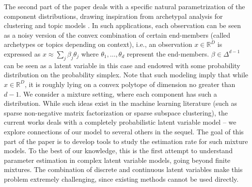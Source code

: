 \documentclass[bj,authoryear]{imsart}
\theoremstyle{plain}
\theoremstyle{remark}
\def\bbR{\mathbb{R}}
\begin{document}
The second part of the paper deals with a specific natural parametrization of the component distributions, drawing inspiration from archetypal analysis \cite{cutler1994archetypal} for clustering and topic models \cite{blei2003latent}. In such applications, each observation can be seen as a noisy version of the convex combination of certain end-members (called archetypes or topics depending on context), i.e., an observation $x\in\bbR^D$ is expressed as $x \approx \sum_j \beta_j\theta_j$ where $\theta_1,\dots,\theta_d$ represent the end-members. $\beta\in\Delta^{d-1}$ can be seen as a latent variable in this case and endowed with some probability distribution on the probability simplex. Note that such modeling imply that while $x\in\bbR^D$, it is roughly lying on a convex polytope of dimension no greater than $d-1$. We consider a mixture setting, where each component has such a distribution. While such ideas exist in the machine learning literature (such as sparse non-negative matrix factorization or sparse subspace clustering), the current works deals with a completely probabilistic latent variable model -- we explore connections of our model to several others in the sequel. The goal of this part of the paper is to develop tools to study the estimation rate for such mixture models. To the best of our knowledge, this is the first attempt to understand parameter estimation in complex latent variable models, going beyond finite mixtures. The combination of discrete and continuous latent variables make this problem extremely challenging, since existing methods cannot be used directly. 
\end{document}
